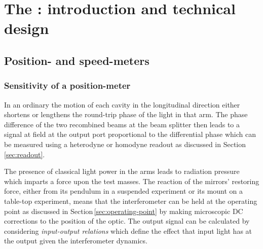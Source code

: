 \chapter{\label{c:speedmeter-intro}The \SSMEXPT{}: introduction and technical design}

\section{Position- and speed-meters}

\subsection{\label{sec:position-meter-measurement}Sensitivity of a position-meter}
In an ordinary \FPMI{} the motion of each cavity in the longitudinal direction either shortens or lengthens the round-trip phase of the light in that arm. The phase difference of the two recombined beams at the beam splitter then leads to a signal at field at the output port proportional to the differential phase which can be measured using a heterodyne or homodyne readout as discussed in Section\,\ref{sec:readout}.

The presence of classical light power in the arms leads to radiation pressure which imparts a force upon the test masses. The reaction of the mirrors' restoring force, either from its pendulum in a suspended experiment or its mount on a table-top experiment, means that the interferometer can be held at the operating point as discussed in Section\,\ref{sec:operating-point} by making microscopic \gls{DC} corrections to the position of the optic. The output signal can be calculated by considering \emph{input-output relations} which define the effect that input light has at the output given the interferometer dynamics.

